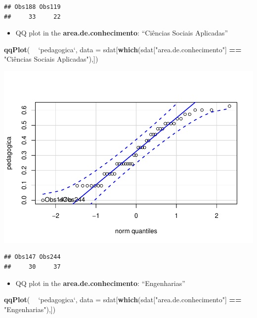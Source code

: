 \documentclass[]{article}
\newenvironment{Shaded}{\begin{snugshade}}{\end{snugshade}}
\newcommand{\DataTypeTok}[1]{\textcolor[rgb]{0.13,0.29,0.53}{#1}}
\newcommand{\KeywordTok}[1]{\textcolor[rgb]{0.13,0.29,0.53}{\textbf{#1}}}
\newcommand{\NormalTok}[1]{#1}
\newcommand{\OperatorTok}[1]{\textcolor[rgb]{0.81,0.36,0.00}{\textbf{#1}}}
\newcommand{\StringTok}[1]{\textcolor[rgb]{0.31,0.60,0.02}{#1}}
\providecommand{\tightlist}{%
  \setlength{\itemsep}{0pt}\setlength{\parskip}{0pt}}
\begin{document}
\begin{verbatim}
## Obs188 Obs119 
##     33     22
\end{verbatim}

\begin{itemize}
\tightlist
\item
  QQ plot in the \textbf{area.de.conhecimento}: ``Ciências Sociais
  Aplicadas''
\end{itemize}

\begin{Shaded}
\begin{Highlighting}[]
\KeywordTok{qqPlot}\NormalTok{( }\OperatorTok{~}\StringTok{ `}\DataTypeTok{pedagogica}\StringTok{`}\NormalTok{, }\DataTypeTok{data =}\NormalTok{ sdat[}\KeywordTok{which}\NormalTok{(sdat[}\StringTok{"area.de.conhecimento"}\NormalTok{] }\OperatorTok{==}\StringTok{ "Ciências Sociais Aplicadas"}\NormalTok{),])}
\end{Highlighting}
\end{Shaded}

\includegraphics{factorialAnova_files/figure-latex/unnamed-chunk-30-1.pdf}

\begin{verbatim}
## Obs147 Obs244 
##     30     37
\end{verbatim}

\begin{itemize}
\tightlist
\item
  QQ plot in the \textbf{area.de.conhecimento}: ``Engenharias''
\end{itemize}

\begin{Shaded}
\begin{Highlighting}[]
\KeywordTok{qqPlot}\NormalTok{( }\OperatorTok{~}\StringTok{ `}\DataTypeTok{pedagogica}\StringTok{`}\NormalTok{, }\DataTypeTok{data =}\NormalTok{ sdat[}\KeywordTok{which}\NormalTok{(sdat[}\StringTok{"area.de.conhecimento"}\NormalTok{] }\OperatorTok{==}\StringTok{ "Engenharias"}\NormalTok{),])}
\end{Highlighting}
\end{Shaded}
\end{document}
